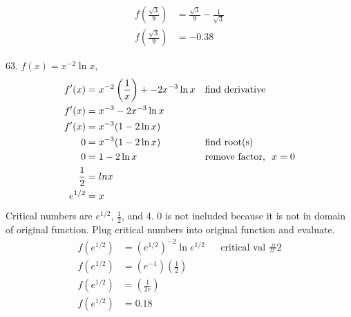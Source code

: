 \documentclass{article}
\begin{document}
\begin{description}
\begin{description}
\begin{align*}
                        f\left(\frac{\sqrt{3}}{9}\right) & = \frac{\sqrt{3}}{9} - \frac{1}{\sqrt{3}}                                             \\[1em]
                        f\left(\frac{\sqrt{3}}{9}\right) & = -0.38
                    \end{align*}
              \item 63. $f(x) = x^{-2}\ln{x}$, \space [$\frac{1}{2}$, 4]
                    \begin{align*}
                        f'(x)       & = x^{-2}\left(\frac{1}{x}\right) + -2x^{-3}\ln{x} &  & \text{find derivative}               \\
                        f'(x)       & = x^{-3} - 2x^{-3}\ln{x}                                                                    \\
                        f'(x)       & = x^{-3} (1 - 2\ln{x})                                                                      \\
                        0           & = x^{-3} (1 - 2\ln{x})                            &  & \text{find root(s)}                  \\
                        0           & =  1 - 2\ln{x}                                    &  & \text{remove factor, \space $x = 0$} \\
                        \frac{1}{2} & = ln{x}                                                                                     \\
                        e^{1/2}     & = x
                    \end{align*}
                    Critical numbers are $e^{1/2}$, $\frac{1}{2}$, and 4. 0 is not included because it is not in domain of original function. Plug critical numbers into original function and evaluate.
                    \begin{align*}
                        f(e^{1/2})                & = (e^{1/2})^{-2}\ln{e^{1/2}}                    &  & \text{critical val \#2} \\
                        f(e^{1/2})                & = (e^{-1})\left(\frac{1}{2}\right)                                           \\
                        f(e^{1/2})                & = \left(\frac{1}{2e}\right)                                                  \\
                        f(e^{1/2})                & = 0.18                                                                       \\[2em]

\end{align*}
\end{description}
\end{description}
\end{document}
